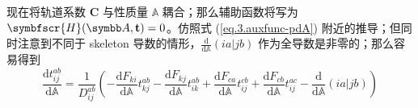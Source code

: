 现在将轨道系数 $\mathbf{C}$ 与性质量 $\mathbb{A}$ 耦合；那么辅助函数将写为 $\symbfscr{H} (\mathbb{A}, \mathbf{t}) = 0$。仿照式 (\ref{eq.3.auxfunc-pdA}) 附近的推导；但同时注意到不同于 skeleton 导数的情形，$\frac{\mathrm{d}}{\mathrm{d} \mathbb{A}} (ia|jb)$ 作为全导数是非零的；那么容易得到
\begin{equation}
    \label{eq.3.pdA-tijab}
    \frac{\mathrm{d} t_{ij}^{ab}}{\mathrm{d} \mathbb{A}} = \frac{1}{D_{ij}^{ab}} \left(
    - \frac{\mathrm{d} F_{ki}}{\mathrm{d} \mathbb{A}} t_{kj}^{ab}
    - \frac{\mathrm{d} F_{kj}}{\mathrm{d} \mathbb{A}} t_{ik}^{ab}
    + \frac{\mathrm{d} F_{ca}}{\mathrm{d} \mathbb{A}} t_{ij}^{cb}
    + \frac{\mathrm{d} F_{cb}}{\mathrm{d} \mathbb{A}} t_{ij}^{ac}
    - \frac{\mathrm{d}}{\mathrm{d} \mathbb{A}} (ia|jb)
    \right)
\end{equation}

